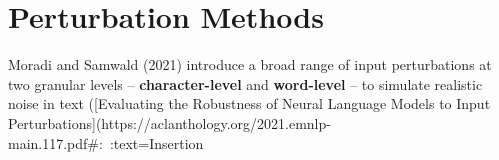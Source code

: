 \section{Perturbation Methods}
Moradi and Samwald (2021) introduce a broad range of input perturbations at two granular levels – \textbf{character-level} and \textbf{word-level} – to simulate realistic noise in text ([Evaluating the Robustness of Neural Language Models to Input Perturbations](https://aclanthology.org/2021.emnlp-main.117.pdf#:~:text=Insertion%

